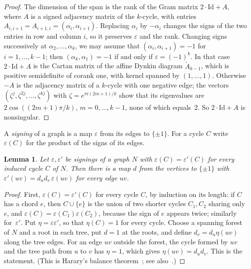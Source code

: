 \documentclass[11pt,a4paper]{article}
\numberwithin{equation}{section}
\theoremstyle{plain}
\newtheorem{lemma}[theorem]{Lemma}
\theoremstyle{definition}
\theoremstyle{remark}
\begin{document}
\begin{proof}
The dimension of the span is the rank of the Gram matrix $2\cdot\mathrm{Id}+A$, where $A$ is a signed adjacency matrix of the $k$-cycle, with entries $A_{i,i+1}=A_{i+1,i}=(\alpha_i,\alpha_{i+1})$. Replacing $\alpha_i$ by $-\alpha_i$ changes the signs of the two entries in row and column $i$, so it preserves $\varepsilon$ and the rank. Changing signs successively at $\alpha_2,\dots,\alpha_k$, we may assume that $(\alpha_i,\alpha_{i+1})=-1$ for $i=1,\dots,k-1$; then $(\alpha_k,\alpha_1)=-1$ if and only if $\varepsilon=(-1)^k$. In that case $2\cdot\mathrm{Id}+A$ is the Cartan matrix of the affine Dynkin diagram $\tilde A_{k-1}$, which is positive semidefinite of corank one, with kernel spanned by $(1,\dots,1)$. Otherwise $-A$ is the adjacency matrix of a $k$-cycle with one negative edge; the vectors $(\zeta^j,\zeta^{2j},\dots,\zeta^{kj})$ with $\zeta=e^{\pi i(2m+1)/k}$ show that its eigenvalues are $2\cos((2m+1)\pi/k)$, $m=0,\dots,k-1$, none of which equals~$2$. So $2\cdot\mathrm{Id}+A$ is nonsingular.
\end{proof}

A \emph{signing} of a graph is a map $\varepsilon$ from its edges to $\{\pm1\}$. For a cycle $C$ write $\varepsilon(C)$ for the product of the signs of its edges.

\begin{lemma}\label{lem:switching}
Let $\varepsilon,\varepsilon'$ be signings of a graph $N$ with $\varepsilon(C)=\varepsilon'(C)$ for every induced cycle $C$ of $N$. Then there is a map $d$ from the vertices to $\{\pm1\}$ with $\varepsilon'(uv)=d_ud_v\,\varepsilon(uv)$ for every edge $uv$.
\end{lemma}

\begin{proof}
First, $\varepsilon(C)=\varepsilon'(C)$ for every cycle $C$, by induction on its length: if $C$ has a chord $e$, then $C\cup\{e\}$ is the union of two shorter cycles $C_1,C_2$ sharing only $e$, and $\varepsilon(C)=\varepsilon(C_1)\varepsilon(C_2)$, because the sign of $e$ appears twice; similarly for~$\varepsilon'$. Put $\eta=\varepsilon\varepsilon'$, so that $\eta(C)=1$ for every cycle. Choose a spanning forest of $N$ and a root in each tree, put $d=1$ at the roots, and define $d_v=d_u\eta(uv)$ along the tree edges. For an edge $uv$ outside the forest, the cycle formed by $uv$ and the tree path from $u$ to $v$ has $\eta=1$, which gives $\eta(uv)=d_ud_v$. This is the statement. (This is Harary's balance theorem~\cite{Har53}; see also~\cite{Zas82}.)
\end{proof}
\end{document}
